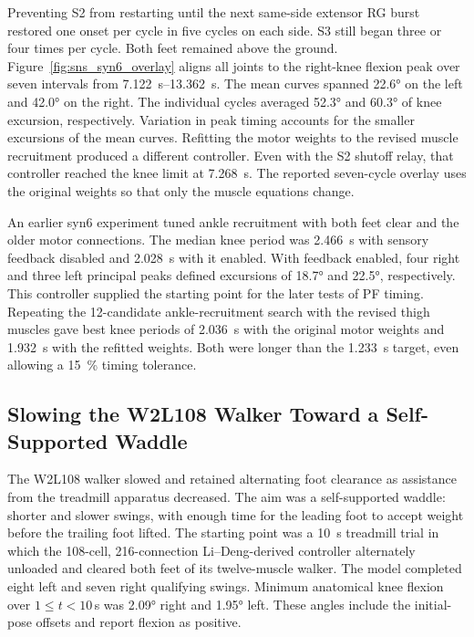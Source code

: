 Preventing S2 from restarting until the next same-side extensor RG burst restored one onset per cycle in five cycles on each side. S3 still began three or four times per cycle. Both feet remained above the ground. Figure~\ref{fig:sns_syn6_overlay} aligns all joints to the right-knee flexion peak over seven intervals from \qtyrange{7.122}{13.362}{\second}. The mean curves spanned \ang{22.6} on the left and \ang{42.0} on the right. The individual cycles averaged \ang{52.3} and \ang{60.3} of knee excursion, respectively. Variation in peak timing accounts for the smaller excursions of the mean curves. Refitting the motor weights to the revised muscle recruitment produced a different controller. Even with the S2 shutoff relay, that controller reached the knee limit at \qty{7.268}{\second}. The reported seven-cycle overlay uses the original weights so that only the muscle equations change.

An earlier syn6 experiment tuned ankle recruitment with both feet clear and the older motor connections. The median knee period was \qty{2.466}{\second} with sensory feedback disabled and \qty{2.028}{\second} with it enabled. With feedback enabled, four right and three left principal peaks defined excursions of \ang{18.7} and \ang{22.5}, respectively. This controller supplied the starting point for the later tests of PF timing. Repeating the 12-candidate ankle-recruitment search with the revised thigh muscles gave best knee periods of \qty{2.036}{\second} with the original motor weights and \qty{1.932}{\second} with the refitted weights. Both were longer than the \qty{1.233}{\second} target, even allowing a \qty{15}{\percent} timing tolerance.

\subsection{Slowing the W2L108 Walker Toward a Self-Supported Waddle}\label{sec:app_w2l108_ground}

The W2L108 walker slowed and retained alternating foot clearance as assistance from the treadmill apparatus decreased. The aim was a self-supported waddle: shorter and slower swings, with enough time for the leading foot to accept weight before the trailing foot lifted. The starting point was a \qty{10}{\second} treadmill trial in which the 108-cell, 216-connection Li--Deng-derived controller alternately unloaded and cleared both feet of its twelve-muscle walker. The model completed eight left and seven right qualifying swings. Minimum anatomical knee flexion over $1\leq t<10$\,s was \ang{2.09} right and \ang{1.95} left. These angles include the initial-pose offsets and report flexion as positive.


